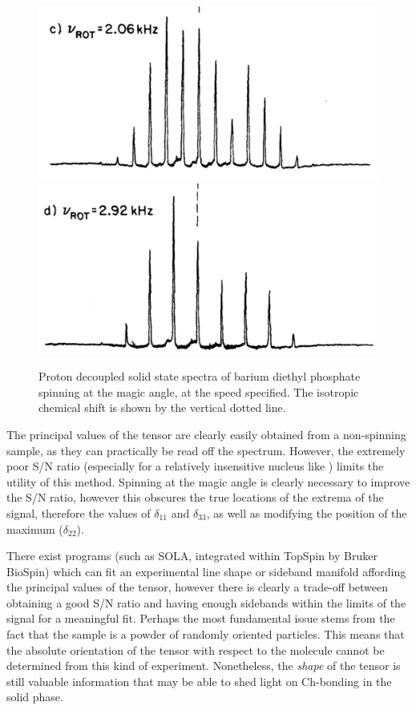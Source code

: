 \begin{refsection}
\begin{figure}
    \includegraphics[width=0.45\linewidth]{Figures/31P-ssnmr-2.06khz.pdf}
    \includegraphics[width=0.45\linewidth]{Figures/31P-ssnmr-2.92khz.pdf}
    \caption[-SS-NMR spinning at the magic angle.]{Proton decoupled solid state  spectra of barium diethyl phosphate spinning at the magic angle, at the speed specified. The isotropic chemical shift is shown by the vertical dotted line.}\label{fig:31P-ssnmr}
\end{figure}

The principal values of the tensor are clearly easily obtained from a non-spinning sample, as they can practically be read off the spectrum.
However, the extremely poor S/N ratio (especially for a relatively insensitive nucleus like ) limits the utility of this method.
Spinning at the magic angle is clearly necessary to improve the S/N ratio, however this obscures the true locations of the extrema of the signal, therefore the values of $ \delta_{11} $ and $ \delta_{33} $, as well as modifying the position of the maximum ($ \delta_{22} $).

There exist programs (such as SOLA, integrated within TopSpin by Bruker BioSpin) which can fit an experimental line shape or sideband manifold affording the principal values of the tensor, however there is clearly a trade-off between obtaining a good S/N ratio and having enough sidebands within the limits of the signal for a meaningful fit.
Perhaps the most fundamental issue stems from the fact that the sample is a powder of randomly oriented particles.
This means that the absolute orientation of the tensor with respect to the molecule cannot be determined from this kind of experiment.
Nonetheless, the \emph{shape} of the tensor is still valuable information that may be able to shed light on Ch-bonding in the solid phase.

\printbibliography[heading=subbibliography]
\end{refsection}
